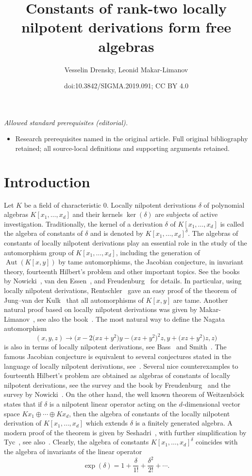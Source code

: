 \documentclass[10pt,a4paper]{amsart}
\title{Constants of rank-two locally nilpotent derivations form free algebras}
\author{Vesselin Drensky, Leonid Makar-Limanov}
\date{doi:10.3842/SIGMA.2019.091; CC BY 4.0}
\numberwithin{equation}{section}
\begin{document}
\maketitle
\noindent\textit{Allowed standard prerequisites (editorial).}\begin{itemize}
\item Research prerequisites named in the original article. Full original bibliography retained; all source-local definitions and supporting arguments retained.
\end{itemize}\medskip
\section{Introduction}
Let $K$ be a field of characteristic 0. Locally nilpotent derivations $\delta$ of polynomial algebras $K[x_1,\ldots,x_d]$ and their kernels $\ker(\delta)$ are subjects of active investigation. Traditionally, the kernel of a derivation $\delta$ of $K[x_1,\ldots,x_d]$ is called the algebra of constants of $\delta$ and is denoted by $K[x_1,\ldots,x_d]^{\delta}$. The algebras of constants of locally nilpotent derivations play an essential role in the study of the automorphism group of $K[x_1,\ldots,x_d]$,
including the generation of $\operatorname{Aut}(K[x,y])$ by tame automorphisms, the Jacobian conjecture, in invariant theory, fourteenth Hilbert's problem and other important topics. See the books by Nowicki~\cite{No1}, van den Essen~\cite{E}, and Freudenburg~\cite{Fr2} for details. In particular, using locally nilpotent derivations,
Rentschler~\cite{R} gave an easy proof of the theorem of Jung--van der Kulk~\cite{J, K} that all automorphisms of $K[x,y]$ are tame. Another natural proof based on locally nilpotent derivations was given by Makar-Limanov~\cite{ML2}, see also the book~\cite{D1}. The most natural way to define the Nagata automorphism~\cite{Na}
\[
(x,y,z)\to\big(x-2\big(xz+y^2\big)y-\big(xz+y^2\big)^2z,y+\big(xz+y^2\big)z,z\big)
\]
is also in terms of locally nilpotent derivations, see Bass~\cite{B} and Smith~\cite{Sm}. The famous Jacobian conjecture is equivalent to several conjectures stated in the language of locally nilpotent derivations, see~\cite{E}. Several nice counterexamples to fourteenth Hilbert's problem are obtained as algebras of constants of locally nilpotent derivations, see the survey and the book by Freudenburg~\cite{Fr1, Fr2} and the survey by Nowicki~\cite{No2}. On the other hand, the well known theorem of Weitzenb\"ock~\cite{W} states that if $\delta$ is a nilpotent linear operator acting on the $d$-dimensional vector space $Kx_1\oplus \cdots\oplus Kx_d$, then the algebra of constants of the locally nilpotent derivation of $K[x_1,\ldots,x_d]$ which extends $\delta$ is a finitely generated algebra. A modern proof of the theorem is given by Seshadri~\cite{Ses}, with further simplification by Tyc~\cite{T}, see also~\cite{No1}. Clearly, the algebra of constants $K[x_1,\ldots,x_d]^{\delta}$ coincides with the algebra of invariants of the linear operator
\[
\exp(\delta)=1+\frac{\delta}{1!}+\frac{\delta^2}{2!}+\cdots .
\]
\end{document}
